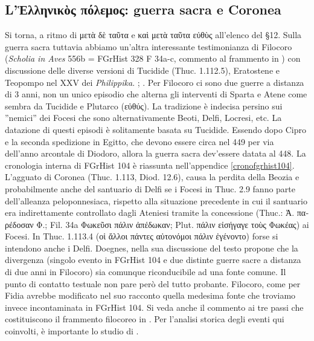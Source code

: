 {            \subsection*{L'\textgreek{Ἑλληνικὸς πόλεμος}: guerra sacra e Coronea}\label{bkm:RefHeading3609919231068}
            Si torna, a ritmo di \textgreek{μετὰ δὲ ταῦτα} e \textgreek{καὶ μετὰ ταῦτα εὐθὺς} all'elenco del §12. Sulla guerra sacra tuttavia abbiamo un'altra interessante testimonianza di Filocoro (\emph{Scholia in Aves} 556b = FGrHist 328 F 34a-c, commento al frammento in \cite[247s]{Costa2007})  con discussione delle diverse versioni di Tucidide (Thuc. 1.112.5), Eratostene e Teopompo  nel XXV dei \emph{Philippika}.  \cite{Hammond1937}; \cite{Pownall1998}.
            Per Filocoro ci sono due guerre a distanza di 3 anni, non un unico episodio che alterna gli interventi di Sparta e Atene come sembra da Tucidide e Plutarco (\textgreek{εὐθύς}). La tradizione è indecisa persino sui ''nemici'' dei Focesi che sono alternativamente Beoti, Delfi, Locresi, etc. La datazione di questi episodi è solitamente basata su Tucidide. Essendo dopo Cipro e la seconda spedizione in Egitto, che devono essere circa nel 449 per via dell'anno arcontale di Diodoro, allora la guerra sacra dev'essere datata al 448. La cronologia interna di FGrHist 104 è riassunta nell'appendice \ref{cronofgrhist104}.  
            L'agguato di Coronea (Thuc. 1.113, Diod. 12.6), causa la perdita della Beozia e probabilmente anche del santuario di Delfi se i Focesi in Thuc. 2.9 fanno parte dell'alleanza peloponnesiaca, rispetto alla situazione precedente in cui il santuario era indirettamente controllato dagli Ateniesi tramite la concessione (Thuc.: \textgreek{Ἀ. παρέδοσαν Φ.}; Fil. 34a \textgreek{Φωκεῦσι πάλιν ἀπέδωκαν}; Plut. \textgreek{πάλιν εἰσήγαγε τοὺς Φωκέας}) ai Focesi. In Thuc. 1.113.4 (\textgreek{οἱ ἄλλοι πάντες αὐτονόμοι πάλιν ἐγένοντο}) forse si intendono anche i Delfi.
            Doegnes, nella sua discussione del testo propone che la divergenza (singolo evento in FGrHist 104 e due distinte guerre sacre a distanza di due anni in Filocoro) sia comunque riconducibile ad una fonte comune. Il punto di contatto testuale non pare però del tutto probante. Filocoro, come per Fidia avrebbe modificato nel suo racconto quella medesima fonte che troviamo invece incontaminata in FGrHist 104. Si veda anche il commento ai tre passi che costituiscono il frammento filocoreo in \cite[247-254]{Costa2007}. Per l'analisi storica degli eventi qui coinvolti, è importante lo studio di \cite[225s]{Sordi2002}. 
}
